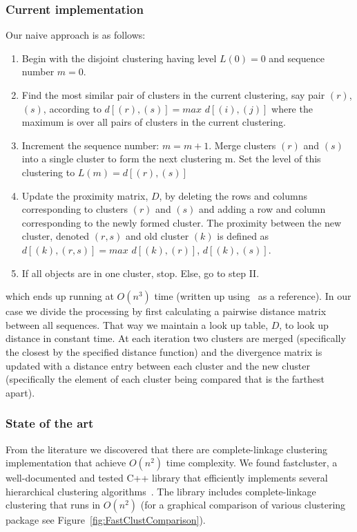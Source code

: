 \subsubsection*{Current implementation}
Our naive approach is as follows:
\begin{enumerate}[I]
\item Begin with the disjoint clustering having level $L(0) = 0$ and sequence number $m = 0$.
\item Find the most similar pair of clusters in the current clustering, say pair $(r)$, $(s)$, according to $d[(r),(s)] = max$ $d[(i),(j)]$ where the maximum is over all pairs of clusters in the current clustering.
\item Increment the sequence number: $m = m + 1$. Merge clusters $(r)$ and $(s)$ into a single cluster to form the next clustering m. Set the level of this clustering to $L(m) = d[(r),(s)]$
\item Update the proximity matrix, $D$, by deleting the rows and columns corresponding to clusters $(r)$ and $(s)$ and adding a row and column corresponding to the newly formed cluster. The proximity between the new cluster, denoted $(r,s)$ and old cluster $(k)$ is defined as $d[(k), (r,s)] = max$ $d[(k),(r)]$, $d[(k),(s)]$.
\item If all objects are in one cluster, stop. Else, go to step II.
\end{enumerate}
which ends up running at $O(n^3)$ time (written up using~\cite{wiki:xxx} as a reference).
In our case we divide the processing by first calculating a pairwise distance matrix between all sequences.
That way we maintain a look up table, $D$, to look up distance in constant time.
At each iteration two clusters are merged (specifically the closest by the specified distance function) and the divergence matrix is updated with a distance entry between each cluster and the new cluster (specifically the element of each cluster being compared that is the farthest apart).

\subsubsection*{State of the art}
From the literature we discovered that there are complete-linkage clustering implementation that achieve $O(n^2)$ time complexity.
We found fastcluster, a well-documented and tested C++ library that efficiently implements several hierarchical clustering algorithms~\cite{mullner2011modern, FastClust}.
The library includes complete-linkage clustering that runs in $O(n^2)$ (for a graphical comparison of various clustering package see Figure~\ref{fig:FastClustComparison}).

